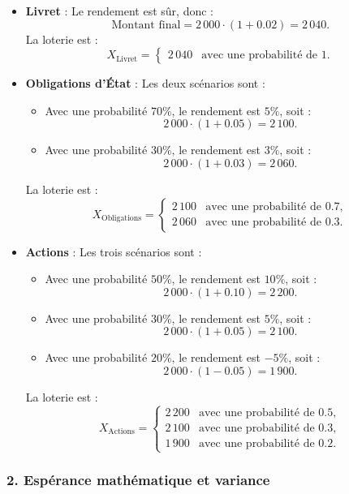 \documentclass[12pt,a4paper]{article}
\begin{document}
\begin{itemize}
	\item \textbf{Livret} :  
	Le rendement est sûr, donc :
	\[
	\text{Montant final} = 2\,000 \cdot (1 + 0.02) = 2\,040.
	\]
	La loterie est :
	\[
	X_{\text{Livret}} = 
	\begin{cases} 
		2\,040 & \text{avec une probabilité de } 1.
	\end{cases}
	\]
	
	\item \textbf{Obligations d’État} :  
	Les deux scénarios sont :
	\begin{itemize}
		\item Avec une probabilité \(70\%\), le rendement est \(5\%\), soit :
		\[
		2\,000 \cdot (1 + 0.05) = 2\,100.
		\]
		\item Avec une probabilité \(30\%\), le rendement est \(3\%\), soit :
		\[
		2\,000 \cdot (1 + 0.03) = 2\,060.
		\]
	\end{itemize}
	La loterie est :
	\[
	X_{\text{Obligations}} = 
	\begin{cases} 
		2\,100 & \text{avec une probabilité de } 0.7, \\
		2\,060 & \text{avec une probabilité de } 0.3.
	\end{cases}
	\]
	
	\item \textbf{Actions} :  
	Les trois scénarios sont :
	\begin{itemize}
		\item Avec une probabilité \(50\%\), le rendement est \(10\%\), soit :
		\[
		2\,000 \cdot (1 + 0.10) = 2\,200.
		\]
		\item Avec une probabilité \(30\%\), le rendement est \(5\%\), soit :
		\[
		2\,000 \cdot (1 + 0.05) = 2\,100.
		\]
		\item Avec une probabilité \(20\%\), le rendement est \(-5\%\), soit :
		\[
		2\,000 \cdot (1 - 0.05) = 1\,900.
		\]
	\end{itemize}
	La loterie est :
	\[
	X_{\text{Actions}} = 
	\begin{cases} 
		2\,200 & \text{avec une probabilité de } 0.5, \\
		2\,100 & \text{avec une probabilité de } 0.3, \\
		1\,900 & \text{avec une probabilité de } 0.2.
	\end{cases}
	\]
\end{itemize}

\subsubsection*{2. Espérance mathématique et variance}
\end{document}
